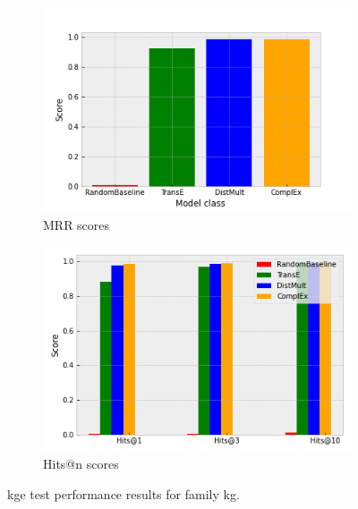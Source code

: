 \begin{figure}[htbp]
\centering
\begin{subfigure}{.5\textwidth}
  \centering
  \includegraphics[width=1\linewidth]{figures/model_selection/family_mrr.png}
  \caption{MRR scores}
  \label{fig:model_selection_mrr_family}
\end{subfigure}%
\begin{subfigure}{.5\textwidth}
  \centering
  \includegraphics[width=1\linewidth]{figures/model_selection/family_hit_scores.png}
  \caption{Hits@n scores}
  \label{fig:model_selection_hit_scores_family}
\end{subfigure}
\caption[KGE test results for family KG.]{\gls{kge} test performance results for family \gls{kg}.}
\label{fig:model_selection_metrics_family}
\end{figure}

